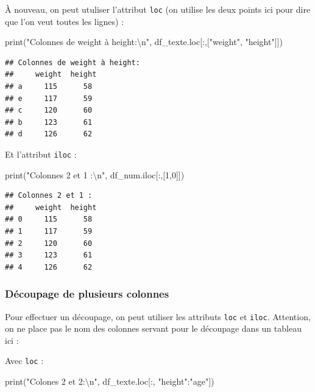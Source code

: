 \documentclass[
  12pt,
]{book}
\newenvironment{Shaded}{\begin{snugshade}}{\end{snugshade}}
\newcommand{\BuiltInTok}[1]{#1}
\newcommand{\CharTok}[1]{\textcolor[rgb]{0.31,0.60,0.02}{#1}}
\newcommand{\DecValTok}[1]{\textcolor[rgb]{0.00,0.00,0.81}{#1}}
\newcommand{\NormalTok}[1]{#1}
\newcommand{\StringTok}[1]{\textcolor[rgb]{0.31,0.60,0.02}{#1}}
\numberwithin{equation}{section}
\numberwithin{countremarque}{section}
\begin{document}
À nouveau, on peut utuliser l'attribut \texttt{loc} (on utilise les deux points ici pour dire que l'on veut toutes les lignes) :

\begin{Shaded}
\begin{Highlighting}[]
\BuiltInTok{print}\NormalTok{(}\StringTok{"Colonnes de weight à height:}\CharTok{\textbackslash{}n}\StringTok{"}\NormalTok{, df\_texte.loc[:,[}\StringTok{"weight"}\NormalTok{, }\StringTok{"height"}\NormalTok{]])}
\end{Highlighting}
\end{Shaded}

\begin{lstlisting}
## Colonnes de weight à height:
##     weight  height
## a     115      58
## e     117      59
## c     120      60
## b     123      61
## d     126      62
\end{lstlisting}

Et l'attribut \texttt{iloc} :

\begin{Shaded}
\begin{Highlighting}[]
\BuiltInTok{print}\NormalTok{(}\StringTok{"Colonnes 2 et 1 :}\CharTok{\textbackslash{}n}\StringTok{"}\NormalTok{, df\_num.iloc[:,[}\DecValTok{1}\NormalTok{,}\DecValTok{0}\NormalTok{]])}
\end{Highlighting}
\end{Shaded}

\begin{lstlisting}
## Colonnes 2 et 1 :
##     weight  height
## 0     115      58
## 1     117      59
## 2     120      60
## 3     123      61
## 4     126      62
\end{lstlisting}

\subsubsection{Découpage de plusieurs colonnes}\label{decoupage-df-colonnes}

Pour effectuer un découpage, on peut utiliser les attributs \texttt{loc} et \texttt{iloc}. Attention, on ne place pas le nom des colonnes servant pour le découpage dans un tableau ici :

Avec \texttt{loc} :

\begin{Shaded}
\begin{Highlighting}[]
\BuiltInTok{print}\NormalTok{(}\StringTok{"Colones 2 et 2:}\CharTok{\textbackslash{}n}\StringTok{"}\NormalTok{, df\_texte.loc[:, }\StringTok{"height"}\NormalTok{:}\StringTok{"age"}\NormalTok{])}
\end{Highlighting}
\end{Shaded}
\end{document}
